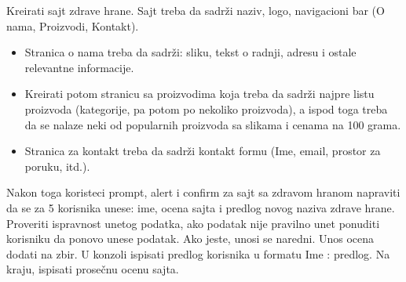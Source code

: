 \begin{primer}
Kreirati sajt zdrave hrane. Sajt treba da sadrži naziv, logo, navigacioni bar (O nama, Proizvodi, Kontakt). 
\begin{itemize}
    \item Stranica o nama treba da sadrži: sliku, tekst o radnji, adresu i ostale relevantne informacije. 
    \item Kreirati potom stranicu sa proizvodima koja treba da sadrži najpre listu proizvoda (kategorije, pa potom po nekoliko proizvoda), a ispod toga treba da se nalaze neki od popularnih proizvoda sa slikama i cenama na 100 grama. 
    \item Stranica za kontakt treba da sadrži kontakt formu (Ime, email, prostor za poruku, itd.).  
\end{itemize}

Nakon toga koristeci prompt, alert i confirm za sajt sa zdravom hranom napraviti da se za 5 korisnika unese: ime, ocena sajta i predlog novog naziva zdrave hrane. Proveriti ispravnost unetog podatka, ako podatak nije pravilno unet ponuditi korisniku da ponovo unese podatak. Ako jeste, unosi se naredni. Unos ocena dodati na zbir. U konzoli ispisati predlog korisnika u formatu Ime : predlog. Na kraju, ispisati prosečnu ocenu sajta.
\end{primer}
\newpage

